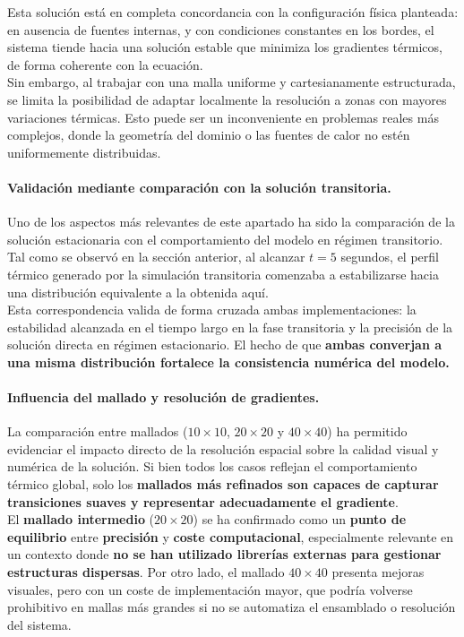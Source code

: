 \documentclass{article}
\begin{document}
Esta solución está en completa concordancia con la configuración física planteada: en ausencia de fuentes internas, y con condiciones constantes en los bordes, el sistema tiende hacia una solución estable que minimiza los gradientes térmicos, de forma coherente con la ecuación. \\

Sin embargo, al trabajar con una malla uniforme y cartesianamente estructurada, se limita la posibilidad de adaptar localmente la resolución a zonas con mayores variaciones térmicas. Esto puede ser un inconveniente en problemas reales más complejos, donde la geometría del dominio o las fuentes de calor no estén uniformemente distribuidas.

\paragraph{Validación mediante comparación con la solución transitoria.} Uno de los aspectos más relevantes de este apartado ha sido la comparación de la solución estacionaria con el comportamiento del modelo en régimen transitorio. Tal como se observó en la sección anterior, al alcanzar $t = 5$ segundos, el perfil térmico generado por la simulación transitoria comenzaba a estabilizarse hacia una distribución equivalente a la obtenida aquí.\\

Esta correspondencia valida de forma cruzada ambas implementaciones: la estabilidad alcanzada en el tiempo largo en la fase transitoria y la precisión de la solución directa en régimen estacionario. El hecho de que \textbf{ambas converjan a una misma distribución fortalece la consistencia numérica del modelo.}


\paragraph{Influencia del mallado y resolución de gradientes.} La comparación entre mallados ($10 \times 10$, $20 \times 20$ y $40 \times 40$) ha permitido evidenciar el impacto directo de la resolución espacial sobre la calidad visual y numérica de la solución. Si bien todos los casos reflejan el comportamiento térmico global, solo los \textbf{mallados más refinados son capaces de capturar transiciones suaves y representar adecuadamente el gradiente}.\\

El \textbf{mallado intermedio} ($20 \times 20$) se ha confirmado como un \textbf{punto de equilibrio} entre \textbf{precisión} y \textbf{coste computacional}, especialmente relevante en un contexto donde \textbf{no se han utilizado librerías externas para gestionar estructuras dispersas}. Por otro lado, el mallado $40 \times 40$ presenta mejoras visuales, pero con un coste de implementación mayor, que podría volverse prohibitivo en mallas más grandes si no se automatiza el ensamblado o resolución del sistema.
\end{document}
